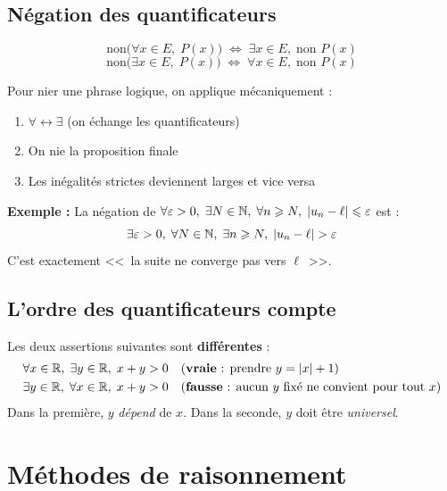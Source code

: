 \subsection{Négation des quantificateurs}

\begin{propbox}
\[
  \text{non}\bigl(\forall x \in E,\; P(x)\bigr) \;\Leftrightarrow\; \exists x \in E,\; \text{non } P(x)
\]
\[
  \text{non}\bigl(\exists x \in E,\; P(x)\bigr) \;\Leftrightarrow\; \forall x \in E,\; \text{non } P(x)
\]
\end{propbox}

\begin{intuitionbox}
Pour nier une phrase logique, on applique mécaniquement :
\begin{enumerate}[leftmargin=1cm]
  \item $\forall \longleftrightarrow \exists$ (on échange les quantificateurs)
  \item On nie la proposition finale
  \item Les inégalités strictes deviennent larges et vice versa
\end{enumerate}
\textbf{Exemple :} La négation de $\forall \varepsilon > 0,\; \exists N \in \mathbb{N},\; \forall n \geqslant N,\; |u_n - \ell| \leqslant \varepsilon$ est :
\[
  \exists \varepsilon > 0,\; \forall N \in \mathbb{N},\; \exists n \geqslant N,\; |u_n - \ell| > \varepsilon
\]
C'est exactement <<~la suite ne converge pas vers $\ell$~>>.
\end{intuitionbox}

\subsection{L'ordre des quantificateurs compte}

\begin{exbox}
Les deux assertions suivantes sont \textbf{différentes} :
\begin{align*}
  &\forall x \in \mathbb{R},\; \exists y \in \mathbb{R},\; x + y > 0 \quad \text{(\textbf{vraie} : prendre $y = |x| + 1$)} \\
  &\exists y \in \mathbb{R},\; \forall x \in \mathbb{R},\; x + y > 0 \quad \text{(\textbf{fausse} : aucun $y$ fixé ne convient pour tout $x$)}
\end{align*}
Dans la première, $y$ \emph{dépend} de $x$. Dans la seconde, $y$ doit être \emph{universel}.
\end{exbox}


\section{Méthodes de raisonnement}


